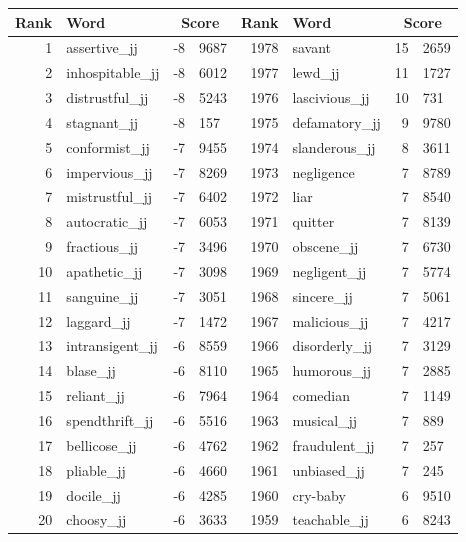 \begin{table}[tbp]
    \begin{tabular}{| rlr@{.}l | rlr@{.}l |}
    \hline
    \textbf{Rank} & \textbf{Word} & \multicolumn{2}{c|}{\textbf{Score}} & \textbf{Rank} & \textbf{Word} & \multicolumn{2}{c|}{\textbf{Score}} \\
    \hline
    1 & assertive\_jj & -8 & 9687    &    1978 & savant & 15 & 2659 \\
    2 & inhospitable\_jj & -8 & 6012    &    1977 & lewd\_jj & 11 & 1727 \\
    3 & distrustful\_jj & -8 & 5243    &    1976 & lascivious\_jj & 10 & 731 \\
    4 & stagnant\_jj & -8 & 157    &    1975 & defamatory\_jj & 9 & 9780 \\
    5 & conformist\_jj & -7 & 9455    &    1974 & slanderous\_jj & 8 & 3611 \\
    6 & impervious\_jj & -7 & 8269    &    1973 & negligence & 7 & 8789 \\
    7 & mistrustful\_jj & -7 & 6402    &    1972 & liar & 7 & 8540 \\
    8 & autocratic\_jj & -7 & 6053    &    1971 & quitter & 7 & 8139 \\
    9 & fractious\_jj & -7 & 3496    &    1970 & obscene\_jj & 7 & 6730 \\
    10 & apathetic\_jj & -7 & 3098    &    1969 & negligent\_jj & 7 & 5774 \\
    11 & sanguine\_jj & -7 & 3051    &    1968 & sincere\_jj & 7 & 5061 \\
    12 & laggard\_jj & -7 & 1472    &    1967 & malicious\_jj & 7 & 4217 \\
    13 & intransigent\_jj & -6 & 8559    &    1966 & disorderly\_jj & 7 & 3129 \\
    14 & blase\_jj & -6 & 8110    &    1965 & humorous\_jj & 7 & 2885 \\
    15 & reliant\_jj & -6 & 7964    &    1964 & comedian & 7 & 1149 \\
    16 & spendthrift\_jj & -6 & 5516    &    1963 & musical\_jj & 7 & 889 \\
    17 & bellicose\_jj & -6 & 4762    &    1962 & fraudulent\_jj & 7 & 257 \\
    18 & pliable\_jj & -6 & 4660    &    1961 & unbiased\_jj & 7 & 245 \\
    19 & docile\_jj & -6 & 4285    &    1960 & cry-baby & 6 & 9510 \\
    20 & choosy\_jj & -6 & 3633    &    1959 & teachable\_jj & 6 & 8243 \\

\end{tabular}
\end{table}

